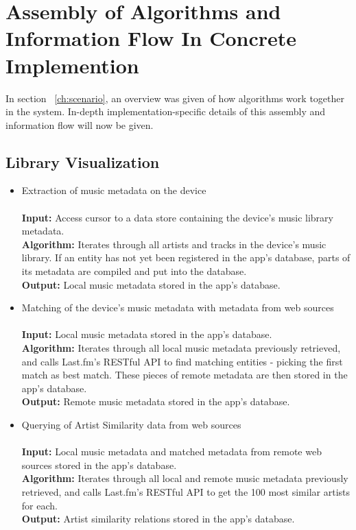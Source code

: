 \section{Assembly of Algorithms and Information Flow In Concrete Implemention}

In section ~\ref{ch:scenario}, an overview was given of how algorithms work together in the system. In-depth implementation-specific details of this assembly and information flow will now be given.

\subsection{Library Visualization}

\begin{itemize}
	\item Extraction of music metadata on the device \\\\
			\textbf{Input:} Access cursor to a data store containing the device's music library metadata.  \\
			\textbf{Algorithm:} Iterates through all artists and tracks in the device's music library.
			If an entity has not yet been registered in the app's database, parts of its metadata are 
			compiled and put into the database. \\
			\textbf{Output:} Local music metadata stored in the app's database.\\
			
	\item Matching of the device's music metadata with metadata from web sources \\\\
			\textbf{Input:} Local music metadata stored in the app's database.  \\
			\textbf{Algorithm:} Iterates through all local music metadata previously retrieved, and calls
			Last.fm's RESTful API to find matching entities - picking the first match as best match. These pieces
			of remote metadata are then stored in the app's database. \\
			\textbf{Output:} Remote music metadata stored in the app's database. \\
			
	\item Querying of Artist Similarity data from web sources \\\\
			\textbf{Input:} Local music metadata and matched metadata from remote web sources stored in the app's database. \\
			\textbf{Algorithm:} Iterates through all local and remote music metadata previously retrieved, and calls
			Last.fm's RESTful API to get the 100 most similar artists for each. \\
			\textbf{Output:} Artist similarity relations stored in the app's database. \\
			

\end{itemize}
